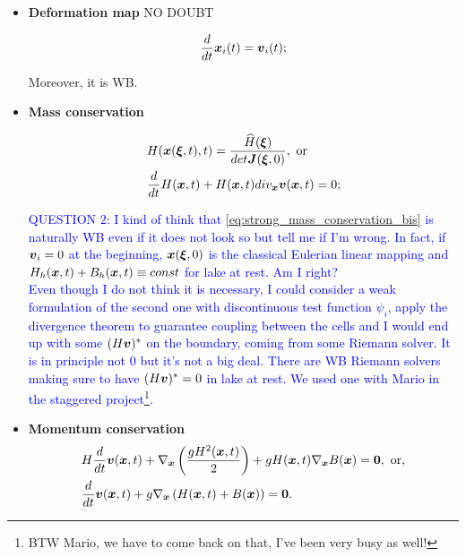 \documentclass[english]{article}
\theoremstyle{thmstyleone}
\theoremstyle{thmstyletwo}
\theoremstyle{thmstylethree}
\newcommand{\uvec}[2][3]{\boldsymbol{#2\mkern-#1mu}\mkern#1mu}
\begin{document}
\begin{itemize}
\item \textbf{Deformation map}
NO DOUBT

\begin{equation}
\frac{d}{dt}\uvec{x}_i(t)=\uvec{v}_i(t);
\end{equation}

Moreover, it is WB.


\item \textbf{Mass conservation}

\begin{align}
&H(\uvec{x}(\uvec{\xi},t),t)=\frac{\widehat{H}(\uvec{\xi})}{det \uvec{J}(\uvec{\xi},0)} ,\text{ or} \label{eq:strong_mass_conservation_bis}\\
&\frac{d}{dt}H(\uvec{x},t)+H(\uvec{x},t)div_{\uvec{x}}\uvec{v}(\uvec{x},t)=0; \label{eq:weak_mass_conservation_bis}
\end{align}

\textcolor{blue}{
QUESTION $2$: I kind of think that \eqref{eq:strong_mass_conservation_bis} is naturally WB even if it does not look so but tell me if I'm wrong. In fact, if $\uvec{v}_i=0$ at the beginning, $\uvec{x}(\uvec{\xi},0)$ is the classical Eulerian linear mapping and $H_h(\uvec{x},t)+B_h(\uvec{x},t)\equiv const$ for lake at rest. Am I right?\\
%
Even though I do not think it is necessary, I could consider a weak formulation of the second one with discontinuous test function $\psi_i$, apply the divergence theorem to guarantee coupling between the cells and I would end up with some $(H\uvec{v})^*$ on the boundary, coming from some Riemann solver. It is in principle not $0$ but it's not a big deal. There are WB Riemann solvers making sure to have $(H\uvec{v})^*=0$ in lake at rest. We used one with Mario in the staggered project\footnote{BTW Mario, we have to come back on that, I've been very busy as well!}.
}

\item \textbf{Momentum conservation}
\begin{align}
&H\frac{d}{dt}\uvec{v}(\uvec{x},t)+\nabla_{\uvec{x}}\left(\frac{gH^2(\uvec{x},t)}{2}\right)+gH(\uvec{x},t)\nabla_{\uvec{x}}B(\uvec{x})=\uvec{0} ,\text{ or}, \label{eq:momentum_non_wb_bis}\\
&\frac{d}{dt}\uvec{v}(\uvec{x},t)+g\nabla_{\uvec{x}}\left(H(\uvec{x},t)+B(\uvec{x})\right)=\uvec{0}. \label{eq:momentum_wb_bis}
\end{align}
\end{itemize}
\end{document}
